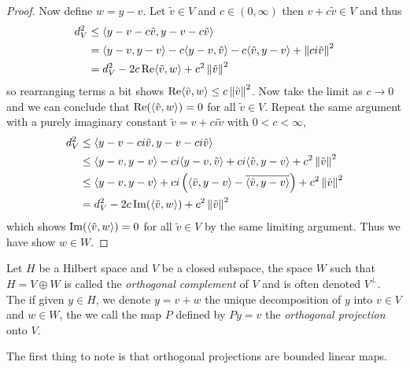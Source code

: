 \begin{proof}
Now define $w = y - v$.   Let $\tilde{v} \in V$ and $c \in (0, \infty)$
then $v + c\tilde{v} \in V$ and thus
\begin{align*}
  d^2_V &\leq \langle y - v - c\tilde{v}, y - v - c\tilde{v} \rangle
  \\
        &=\langle y - v, y - v \rangle -
          c \langle y-v,  \tilde{v} \rangle - c \langle \tilde{v} ,
          y-v\rangle
          + \left \lVert ci\tilde{v} \right \rVert^2 \\
  &=d^2_V -2c \operatorname*{Re} \langle \tilde{v}, w \rangle + c^2 \left \lVert \tilde{v} \right \rVert^2
\end{align*}
so rearranging terms a bit shows $\operatorname*{Re} \langle \tilde{v}, w
\rangle \leq c \left \lVert \tilde{v} \right \rVert^2$.   Now take the limit as $c \to 0$
and we can conclude that $\operatorname*{Re} (\langle \tilde{v}, w \rangle) = 0$
for all $\tilde{v} \in V$.   Repeat the same argument with a purely
imaginary constant
$\tilde{v} = v + ci \tilde{v}$ with $0 < c < \infty$,
\begin{align*}
  d^2_V &\leq \langle y - v - ci\tilde{v}, y - v - ci\tilde{v} \rangle
  \\
        &\leq \langle y - v , y - v \rangle -
          ci \langle y -v ,  \tilde{v} \rangle + ci \langle \tilde{v}
          , y - v\rangle
          + c^2 \left \lVert \tilde{v} \right \rVert^2 \\
        &\leq \langle y - v , y - v \rangle + ci \left( \langle
          \tilde{v} 
          , y - v\rangle -
          \overline{ \langle \tilde{v},  y -v  \rangle} \right)
          + c^2 \left \lVert \tilde{v} \right \rVert^2 \\
  &=d^2_V -2c \operatorname*{Im}(\langle \tilde{v}, w \rangle) + c^2 \left \lVert \tilde{v} \right \rVert^2
\end{align*}
which shows  $\operatorname*{Im} (\langle \tilde{v}, w \rangle) = 0$
for all $\tilde{v} \in V$ by the same limiting argument.   Thus we
have show $w \in W$.
\end{proof}

\begin{defn}Let $H$ be a Hilbert space and $V$ be a closed subspace,
  the space $W$ such that $H = V \oplus W$ is called the
  \emph{orthogonal complement} of $V$ and is often denoted $V^\perp$.
  The if given $y \in H$, we denote $y = v + w$ the unique
  decomposition of $y$ into $v \in V$ and $w \in W$, the we call the
  map $P$ defined by $P y = v$ the \emph{orthogonal projection} onto $V$.
\end{defn}

The first thing to note is that orthogonal projections are bounded
linear maps.

